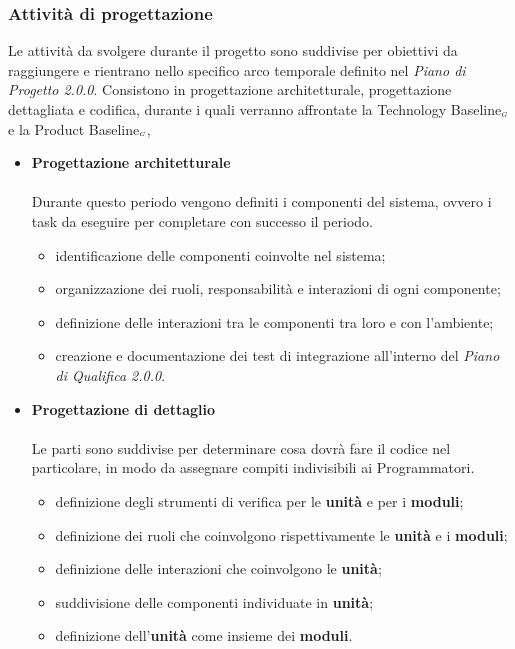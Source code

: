 \subsubsection{Attività di progettazione}\label{ProcessiPrimariProgettazioneAttivita}
Le attività da svolgere durante il progetto sono suddivise per obiettivi da raggiungere e rientrano nello specifico arco temporale definito nel  \textit{Piano di Progetto 2.0.0}. Consistono in progettazione architetturale, progettazione dettagliata e codifica, durante i quali verranno affrontate la Technology Baseline$_{\scaleto{G}{3pt}}$ e la Product Baseline$_{\scaleto{G}{3pt}}$,
\begin{itemize}
	\item \textbf{Progettazione architetturale} \\ \\
	Durante questo periodo vengono definiti i componenti del sistema, ovvero i task da eseguire per completare con successo il periodo.
	\begin{itemize}
		\item identificazione delle componenti coinvolte nel sistema;
		\item organizzazione dei ruoli, responsabilità e interazioni di ogni componente;
		\item definizione delle interazioni tra le componenti tra loro e con l’ambiente;
		\item creazione e documentazione dei test di integrazione all’interno del \textit{Piano di Qualifica 2.0.0}.
	\end{itemize}
	\end{itemize}

\begin{itemize}
	\item \textbf{Progettazione di dettaglio} \\ \\
	Le parti sono suddivise per determinare cosa dovrà fare il codice nel particolare, in modo da assegnare compiti indivisibili ai Programmatori.
	\begin{itemize}
		\item definizione degli strumenti di verifica per le \textbf{unità} e per i \textbf{moduli};
		\item definizione dei ruoli che coinvolgono rispettivamente le \textbf{unità} e i \textbf{moduli};
		\item definizione delle interazioni che coinvolgono le \textbf{unità};
		\item suddivisione delle componenti individuate in \textbf{unità};
		\item definizione dell'\textbf{unità} come insieme dei \textbf{moduli}.
	\end{itemize}
\end{itemize}

